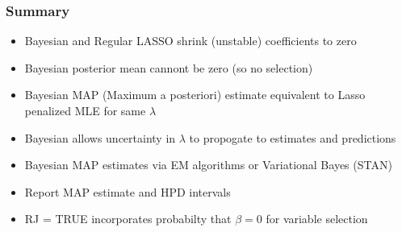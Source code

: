 \documentclass[handout]{beamer}\usepackage[]{graphicx}\usepackage[]{color}
\begin{document}
\begin{frame}\frametitle{Summary}

\begin{itemize}
\item Bayesian and Regular LASSO shrink (unstable) coefficients to zero  \pause
\item Bayesian posterior mean cannont be zero (so no selection)  \pause
\item Bayesian MAP (Maximum a posteriori) estimate equivalent to Lasso penalized MLE for same $\lambda$  \pause
\item Bayesian allows uncertainty in $\lambda$ to propogate to estimates and predictions  \pause
\item Bayesian MAP estimates via EM algorithms or Variational Bayes (STAN)  \pause
\item Report MAP estimate and HPD intervals
\pause
\item RJ = TRUE incorporates probabilty that $\beta = 0$ for variable selection

\end{itemize}

\end{frame}
\end{document}
